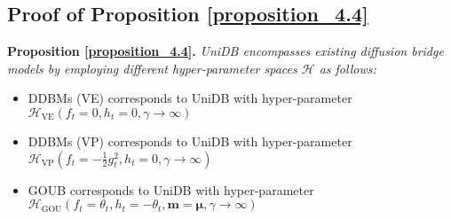 \subsection{Proof of Proposition \ref{proposition_4.4}}\label{proof_proposition_4.4}
\noindent \textbf{Proposition \ref{proposition_4.4}.} \textit{UniDB encompasses existing diffusion bridge models by employing different hyper-parameter spaces $\mathcal{H}$ as follows: }
\begin{itemize}
\item DDBMs (VE) corresponds to UniDB with hyper-parameter $\mathcal{H}_\text{VE}(f_t=0, h_t=0, \gamma \rightarrow \infty)$
\item DDBMs (VP) corresponds to UniDB with hyper-parameter $\mathcal{H}_\text{VP}(f_t=-\frac{1}{2} g^2_t, h_t=0, \gamma \rightarrow \infty)$
\item GOUB corresponds to UniDB with hyper-parameter $\mathcal{H}_\text{GOU}(f_t=\theta_t, h_t=-\theta_t, \mathbf{m} = \boldsymbol{\mu}, \gamma \rightarrow \infty)$
\end{itemize}


